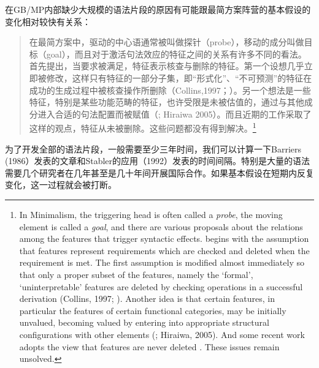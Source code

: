 在GB/MP内部缺少大规模的语法片段的原因有可能跟最简方案阵营的基本假设的变化相对较快有关系：
\begin{quotation}
\label{Zitat-Stabler}
在最简方案中，驱动的中心语通常被叫做探针（probe），移动的成分叫做目标（goal），而且对于激活句法效应的特征之间的关系有许多不同的看法。\citet[229]{Chomsky95a-u}首先提出，当要求被满足，特征表示核查与删除的特征。第一个设想几乎立即被修改，这样只有特征的一部分子集，即“形式化”、“不可预测”的特征在成功的生成过程中被核查操作所删除（Collins,1997；\citealp[§4.5]{Chomsky95a-u}）。另一个想法是一些特征，特别是某些功能范畴的特征，也许受限是未被估值的，通过与其他成分进入合适的句法配置而被赋值（\citealp{Chomsky2008a}; Hiraiwa 2005）。而且近期的工作采取了这样的观点，特征从未被删除\citep[11]{Chomsky2007a}。这些问题都没有得到解决。\citep[]{Stabler2010a}\footnote{%
In Minimalism, the triggering head is often called a \emph{probe}, the moving element is called a
\emph{goal}, and there are various proposals about the relations among the features that trigger
syntactic effects.  \citet[p.\,229]{Chomsky95a-u} begins with the assumption that features represent
requirements which are checked and deleted when the requirement is met. The first assumption is
modified almost immediately so that only a proper subset of the features, namely the `formal',
`uninterpretable' features are deleted by checking operations in a successful derivation (Collins,
1997; \citealp[§4.5]{Chomsky95a-u}). Another idea is that certain features, in particular the
features of certain functional categories, may be initially unvalued, becoming valued by entering
into appropriate structural configurations with other elements (\citealp{Chomsky2008a}; Hiraiwa,
2005). And some recent work adopts the view that features are never deleted
\citep[]{Chomsky2007a}. These issues remain unsolved.}
\end{quotation}
为了开发全部的语法片段，一般需要至少三年时间，我们可以计算一下Barriers (1986）发表的文章和Stabler的应用（1992）发表的时间间隔。特别是大量的语法需要几个研究者在几年甚至是几十年间开展国际合作。如果基本假设在短期内反复变化，这一过程就会被打断。

